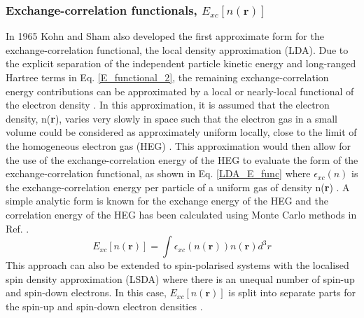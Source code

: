 \documentclass[11pt, twoside]{report}
\begin{document}



\subsubsection{Exchange-correlation functionals, $E_{xc}[n(\textbf{r})]$}
In 1965 Kohn and Sham also developed the first approximate form for the exchange-correlation functional, the local density approximation (LDA). Due to the explicit separation of the independent particle kinetic energy and long-ranged Hartree terms in Eq. \ref{E_functional_2}, the remaining exchange-correlation energy contributions can be approximated by a local or nearly-local functional of the electron density \cite{RichardMartin_Ch7}. In this approximation, it is assumed that the electron density, n(\textbf{r}), varies very slowly in space such that the electron gas in a small volume could be considered as approximately uniform locally, close to the limit of the homogeneous electron gas (HEG) \cite{RichardMartin_Ch8}. This approximation would then allow for the use of the exchange-correlation energy of the HEG to evaluate the form of the exchange-correlation functional, as shown in Eq. \ref{LDA_E_func} where $\epsilon_{xc}(n)$ is the exchange-correlation energy per particle of a uniform gas of density n(\textbf{r}) \cite{Prasad_ch3}. A simple analytic form is known for the exchange energy of the HEG and the correlation energy of the HEG has been calculated using Monte Carlo methods in Ref.  \cite{RichardMartin_Ch8}.
\begin{equation}\label{LDA_E_func}
E_{xc}[n(\mathbf{r})] = \int \epsilon_{xc}(n(\mathbf{r}))n(\mathbf{r})d^3r
\end{equation}
This approach can also be extended to spin-polarised systems with the localised spin density approximation (LSDA) where there is an unequal number of spin-up and spin-down electrons. In this case, $E_{xc}[n(\mathbf{r})]$ is split into separate parts for the spin-up and spin-down electron densities \cite{Prasad_ch3}.
\end{document}
